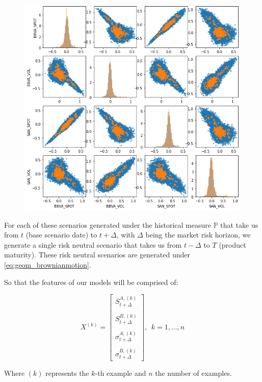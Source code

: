 \begin{figure}[H] 
\centering
\includegraphics[width=1.0\textwidth]{Figures/MarketRisk/GaussMixture.png}
\caption{}
\label{fig:distrib_P_simul}
\end{figure}

For each of these scenarios generated under the historical measure $\mathbb{P}$ that take us from $t$ (base scenario date) to $t+\Delta$, with $\Delta$ being the market risk horizon, we generate a single risk neutral scenario that takes us from $t-\Delta$ to $T$ (product maturity). These risk neutral scenarios are generated under \ref{eq:geom_brownianmotion}. 

So that the features of our models will be comprised of:

$$
X^{(k)}=\left[\begin{array}{c}
S_{t+\Delta}^{A,(k)} \\ \\
S_{t+\Delta}^{B,(k)} \\ \\
\sigma_{t+\Delta}^{A,(k)} \\ \\
\sigma_{t+\Delta}^{B,(k)}
\end{array}\right], \ \  k=1, \ldots, n
$$

Where $(k)$ represents the $k$-th example and $n$ the number of examples.

